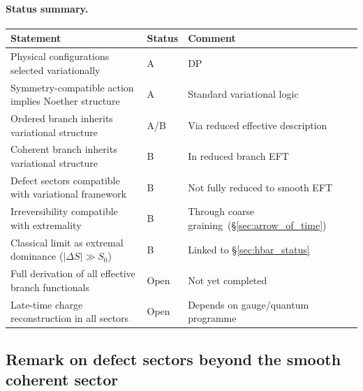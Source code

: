\documentclass[11pt,a4paper]{article}
\numberwithin{equation}{section}
\begin{document}
\paragraph{Status summary.}
\begin{center}
\renewcommand{\arraystretch}{1.2}
\begin{tabular}{p{6.3cm}p{2.0cm}p{5.0cm}}
\hline
Statement & Status & Comment \\
\hline
Physical configurations selected variationally
  & A & DP \\
Symmetry-compatible action implies Noether structure
  & A & Standard variational logic \\
Ordered branch inherits variational structure
  & A/B & Via reduced effective description \\
Coherent branch inherits variational structure
  & B & In reduced branch EFT \\
Defect sectors compatible with variational framework
  & B & Not fully reduced to smooth EFT \\
Irreversibility compatible with extremality
  & B & Through coarse graining~(\S\ref{sec:arrow_of_time}) \\
Classical limit as extremal dominance ($|\Delta S|\gg S_0$)
  & B & Linked to \S\ref{sec:hbar_status} \\
Full derivation of all effective branch functionals
  & Open & Not yet completed \\
Late-time charge reconstruction in all sectors
  & Open & Depends on gauge/quantum programme \\
\hline
\end{tabular}
\end{center}

\subsection{Remark on defect sectors beyond the smooth coherent sector}
\label{sec:defect_sectors}
\end{document}
